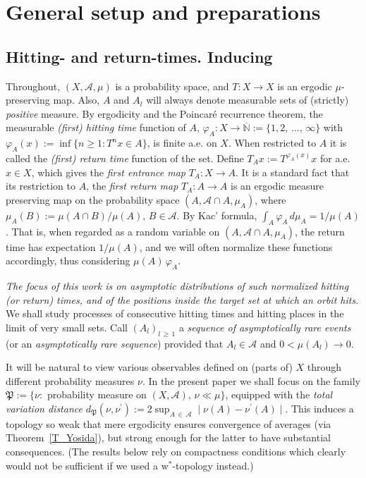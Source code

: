 \documentclass[10pt]{amsart}
\theoremstyle{definition}\newtheorem{defi}[theo]{Definition}\newtheorem{rema}[theo]{Remark}\newtheorem{exam}[theo]{Example}\newtheorem{exem}[theo]{Example}\newtheorem{nota}[theo]{Notation}
\newcommand{\clA}{\mathcal{A}}
\newcommand{\frkP}{\mathfrak{P}}
\newcommand{\bbN}{\mathbb{N}}
\begin{document}
\section{General setup and preparations}

\subsection{Hitting- and return-times. Inducing}
Throughout, $(X,\clA,\mu)$ is a probability space, and $T:X\rightarrow X$ is an ergodic $\mu $-preserving map. Also, $A$ and $A_{l}$ will always denote measurable sets of (strictly) \emph{positive} measure. By ergodicity and the Poincaré recurrence theorem, the measurable \emph{(first) hitting time} function of $A $, $\varphi_{A}:X\rightarrow\overline{\bbN}:=\{1,2,\,\ldots,\,\infty\}$ with $\varphi_{A}(x):=\inf\{n\geq1:T^{n}x\in A\}$, is finite a.e. on $X$. When restricted to $A$ it is called the \emph{(first) return time} function of the set. Define $T_{A}x:=T^{\varphi_{A}(x)}x$ for a.e. $x\in X$, which gives the
\emph{first entrance map} $T_{A}:X\rightarrow A$. It is a standard fact that its restriction to $A$, the \emph{first return map} $T_{A}:A\rightarrow A$ is an ergodic measure preserving map on the probability space $(A,\clA\cap A,\mu_{A})$, where $\mu_{A}(B):=\mu(A\cap B)/\mu(A)$, $B\in\clA$. By Kac' formula, $\int_{A}\varphi_{A}\,d\mu_{A}=1/\mu(A)$. That is, when regarded as a random variable on $(A,\clA\cap A,\mu_{A})$, the return time has expectation $1/\mu(A)$, and we will often normalize these functions accordingly, thus considering $\mu(A)\,\varphi_{A}$.

\emph{The focus of this work is on asymptotic distributions of such normalized hitting (or return) times, and of the positions inside the target set at which an orbit hits.} We shall study processes of consecutive hitting times and hitting places in the limit of very small sets. Call $(A_{l})_{l\,\geq\,1}$ a \emph{sequence of asymptotically rare events} (or an
\emph{asymptotically rare sequence}) provided that $A_{l}\in\clA$ and $0<\mu(A_{l})\rightarrow0$.

It will be natural to view various observables defined on (parts of) $X$ through different probability measures $\nu$. In the present paper we shall focus on the family $\frkP:=\{\nu:$ probability measure on $(X,\clA)$, $\nu\ll\mu\}$, equipped with the \emph{total variation distance} $d_{\frkP}(\nu,\nu^{\prime}):=2\sup_{A\,\in\,\clA}\mid
\nu(A)-\nu^{\prime}(A)\mid$. This induces a topology so weak that mere ergodicity ensures convergence of averages (via Theorem~\ref{T_Yosida}), but strong enough for the latter to have substantial consequences. (The results below rely on compactness conditions which clearly would not be sufficient if we used a w$^{\ast}$-topology instead.)
\end{document}
